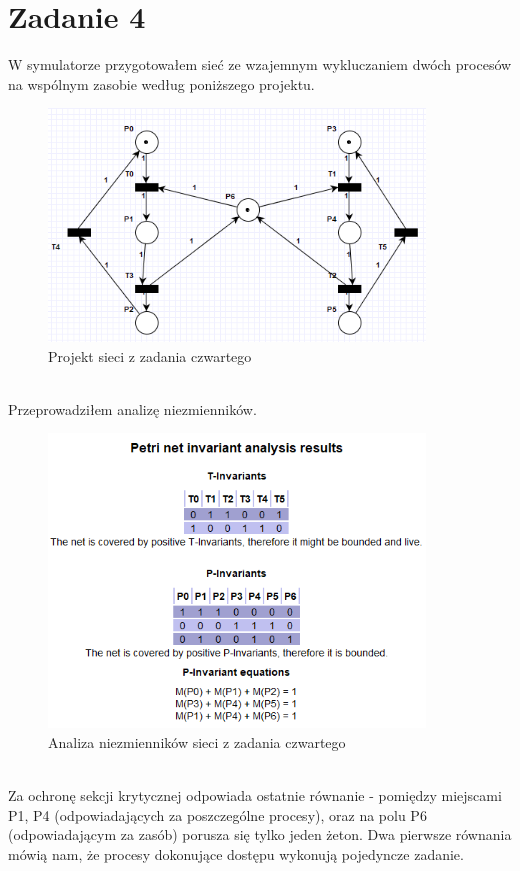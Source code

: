 \documentclass{article}
\begin{document}
    \section{Zadanie 4}
        W symulatorze przygotowałem sieć ze wzajemnym wykluczaniem dwóch procesów na wspólnym zasobie według poniższego projektu.
        \begin{figure}[h!]
            \centering
            \includegraphics[width=10cm]{lab6/n4.png}
            \caption{Projekt sieci z zadania czwartego}
        \end{figure}\\
        \FloatBarrier
        Przeprowadziłem analizę niezmienników. 
        \begin{figure}[h!]
            \centering
            \includegraphics[width=10cm]{lab6/n4_1.png}
            \caption{Analiza niezmienników sieci z zadania czwartego}
        \end{figure}\\
        \FloatBarrier
        Za ochronę sekcji krytycznej odpowiada ostatnie równanie - pomiędzy miejscami P1, P4 (odpowiadających za poszczególne procesy), oraz na polu P6 (odpowiadającym za zasób) porusza się tylko jeden żeton. Dwa pierwsze równania mówią nam, że procesy dokonujące dostępu wykonują pojedyncze zadanie.
\end{document}
